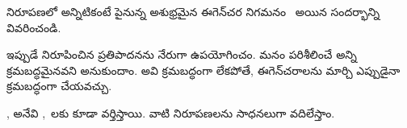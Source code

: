 \documentclass[../../../include/open-logic-section]{subfiles}
\begin{document}
\begin{prob}
 నిరూపణలో అన్నిటికంటే పైనున్న అశుభ్రమైన ఈగెన్‌చర నిగమనం~\Elim{\lexists} అయిన సందర్భాన్ని వివరించండి.
\end{prob}

ఇప్పుడే నిరూపించిన ప్రతిపాదనను నేరుగా ఉపయోగించం. మనం పరిశీలించే అన్ని  క్రమబద్ధమైనవని అనుకుందాం. అవి క్రమబద్ధంగా లేకపోతే, ఈగెన్‌చరాలను మార్చి ఎప్పుడైనా క్రమబద్ధంగా చేయవచ్చు.

,  అనేవి ,~లకు కూడా వర్తిస్తాయి. వాటి నిరూపణలను సాధనలుగా వదిలేస్తాం.
\end{document}
